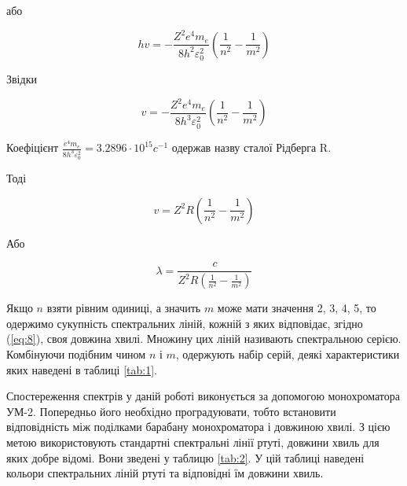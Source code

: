 \documentclass[twocolumn]{el-author}
\begin{document}
або

\begin{equation} 
hv = - \frac{Z^{2}e^{4}m_{e}}{8h^{2} \varepsilon _{0}^{2}} 
\left ( \frac{1}{n^{2}} - \frac{1}{m^{2}} \right )
\end{equation}

Звідки

\begin{equation} \label{eq:7}
v = - \frac{Z^{2}e^{4}m_{e}}{8h^{3} \varepsilon _{0}^{2}} 
\left ( \frac{1}{n^{2}} - \frac{1}{m^{2}} \right )
\end{equation}

Коефіцієнт $\frac{e^{4} m_{e}}{8h^{3} \varepsilon _{0}^{2}} = 3.2896 \cdot 10^{15}c^{-1}$ одержав назву сталої Рідберга R.

Тоді

\begin{equation} 
v = Z^{2}R
\left ( \frac{1}{n^{2}} - \frac{1}{m^{2}} \right )
\end{equation}

Або

\begin{equation} \label{eq:8}
\lambda = \frac{c}{Z^{2}R \left ( \frac{1}{n^{2}} - \frac{1}{m^{2}} \right )}
\end{equation}

Якщо $n$ взяти рівним одиниці, а значить $m$ може мати значення 2, 3, 4,
5, то одержимо сукупність спектральних ліній, кожній з яких відповідає,
згідно (\ref{eq:8}), своя довжина хвилі. Множину цих ліній називають
спектральною серією. Комбінуючи подібним чином $n$ і $m$, одержують набір
серій, деякі характеристики яких наведені в таблиці \ref{tab:1}.


Спостереження спектрів у даній роботі виконується за допомогою
монохроматора УМ-2. Попередньо його необхідно проградуювати, тобто
встановити відповідність між поділками барабану монохроматора і
довжиною хвилі. З цією метою використовують стандартні спектральні лінії
ртуті, довжини хвиль для яких добре відомі. Вони зведені у таблицю \ref{tab:2}. У
цій таблиці наведені кольори спектральних ліній ртуті та відповідні їм
довжини хвиль.
\end{document}

